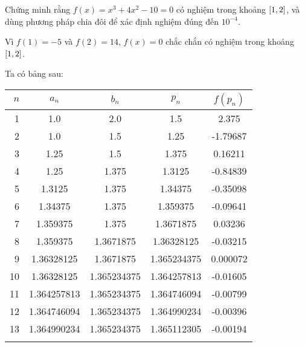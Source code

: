 \documentclass[../../Lectures.tex]{subfiles}
\begin{document}
\begin{exmp}
    Chứng minh rằng \(f(x) = x^3 + 4x^2 - 10 = 0\) có nghiệm trong khoảng
    \(\interval{1}{2}\), và dùng phương pháp chia đôi để xác định nghiệm đúng
    đến \(10^{-4}\).

    Vì \(f(1) = -5\) và \(f(2) = 14\), \(f(x) = 0\) chắc chắn có nghiệm trong
    khoảng \(\interval{1}{2}\).

    Ta có bảng sau:

    \begin{tabular}{ r S[table-format=1.9] S[table-format=1.9] S[table-format=1.9] S[table-format=-1.6] }    %
        \\    %
        \toprule
         {\(n\)} &   {\(a_n\)}   &   {\(b_n\)}   &   {\(p_n\)}   & {\(f(p_n)\)} \\
          &  1.0          &  2.0          &  1.5          &   2.375      \\
              2  &  1.0          &  1.5          &  1.25         &  -1.79687    \\
              3  &  1.25         &  1.5          &  1.375        &   0.16211    \\
              4  &  1.25         &  1.375        &  1.3125       &  -0.84839    \\
              5  &  1.3125       &  1.375        &  1.34375      &  -0.35098    \\
              6  &  1.34375      &  1.375        &  1.359375     &  -0.09641    \\
              7  &  1.359375     &  1.375        &  1.3671875    &   0.03236    \\
              8  &  1.359375     &  1.3671875    &  1.36328125   &  -0.03215    \\
              9  &  1.36328125   &  1.3671875    &  1.365234375  &   0.000072   \\
             10  &  1.36328125   &  1.365234375  &  1.364257813  &  -0.01605    \\
             11  &  1.364257813  &  1.365234375  &  1.364746094  &  -0.00799    \\
             12  &  1.364746094  &  1.365234375  &  1.364990234  &  -0.00396    \\
             13  &  1.364990234  &  1.365234375  &  1.365112305  &  -0.00194    \\
        \bottomrule
        \\    %
    \end{tabular}


\end{exmp}
\end{document}
